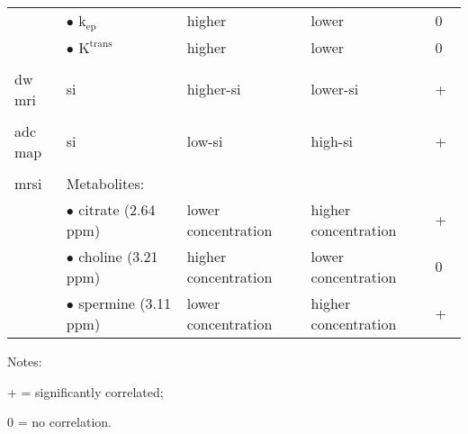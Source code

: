 \begin{table}
\begin{threeparttable}
\begin{tabularx}{\linewidth}{@{} l X X X l @{}}
        & $\bullet$ $\text{k}_{\text{ep}}$ & higher & lower & 0 \\
        & $\bullet$ $\text{K}^{\text{trans}}$ & higher & lower & 0 \\ \\
        \acs*{dw} \acs*{mri} & \acs*{si} &
        higher-\acs*{si}~\cite{Huisman2003,Barentsz2012} &
        lower-\acs*{si}~\cite{Huisman2003,Barentsz2012} & + \\ \\
        \acs*{adc} map & \acs*{si} & low-\acs*{si}~\cite{Barentsz2012} &
        high-\acs*{si}~\cite{Barentsz2012} & +~\cite{Hambrock2011, Itou2011,
          Peng2013} \\ \\
        \acs*{mrsi}& Metabolites: & & & \\
        & $\bullet$ citrate (2.64 ppm)~\cite{Verma2010} & lower
        concentration~\cite{Awwad2012,Costello2006,Graaf2000} & higher
        concentration~\cite{Awwad2012,Costello2006,Graaf2000} &
        +~\cite{Giskeodegard2013} \\
        & $\bullet$ choline (3.21 ppm)~\cite{Verma2010} & higher
        concentration~\cite{Awwad2012,Costello2006,Graaf2000} & lower
        concentration~\cite{Awwad2012,Costello2006,Graaf2000} &
        0~\cite{Giskeodegard2013} \\
        & $\bullet$ spermine (3.11 ppm)~\cite{Verma2010} & lower
        concentration~\cite{Awwad2012,Costello2006,Graaf2000} & higher
        concentration~\cite{Awwad2012,Costello2006,Graaf2000} &
        +~\cite{Giskeodegard2013} \\
        \bottomrule
      \end{tabularx}
      \begin{tablenotes}
      \item Notes:
      \item + = significantly correlated;
      \item 0 = no correlation.
      \end{tablenotes}
    \end{threeparttable}
  \label{tab:modmri}
\end{table}
